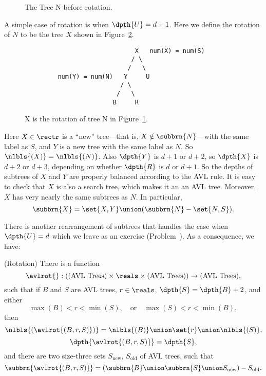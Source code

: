 \begin{definition}
\begin{figure}
\caption{The Tree N before rotation.}

\label{rotate1}

\end{figure}

A simple case of rotation is when $\dpth{U} = d+1$.  Here we define
the rotation of $N$ to be the tree $X$ shown in Figure~\ref{rotate2}.

\begin{figure}

\begin{verbatim}
                              X   num(X) = num(S)
                             / \
                            /   \
         num(Y) = num(N)   Y     U
                          / \  
                         /   \
                        B     R   
\end{verbatim}

\caption{X is the rotation of tree N in Figure~\ref{rotate1}.}

\label{rotate2}
                                                                   
\end{figure}                                                       

Here $X \in \rectr$ is a ``new'' tree---that is, $X \notin
\subbrn{N}$---with the same label as $S$, and $Y$ is a new tree with
the same label as $N$.  So $\nlbls{(X)} = \nlbls{(N)}$.  Also
$\dpth{Y}$ is $d+1$ or $d+2$, so $\dpth{X}$ is $d+2$ or $d+3$,
depending on whether $\dpth{R}$ is $d$ or $d+1$.  So the depths of
subtrees of $X$ and $Y$ are properly balanced according to the AVL
rule.  It is easy to check that $X$ is also a search tree, which makes
it an an AVL tree.  Moreover, $X$ has very nearly the same subtrees as
$N$.  In particular,
\[
\subbrn{X} = \set{X,Y} \union (\subbrn{N} - \set{N,S}).
\]

There is another rearrangement of subtrees that handles the case when
$\dpth{U} = d$ which we leave as an exercise
(Problem~).  As a consequence, we have:

\begin{lemma}(Rotation)\label{lem:rot}
There is a function
\[
\avlrot{}: (\text{(AVL Trees)} \times \reals\times \text{(AVL Trees)}) \to \text{(AVL Trees)},
\]
such that if $B$ and $S$ are AVL trees, $r \in \reals$, $\dpth{S}=\dpth{B}+2$, and either
\[
\max(B) < r < \min(S),\quad \text{or}\quad  \max(S) < r < \min(B),
\]
then
\[
    \nlbls{(\avlrot{(B,r,S)})} = \nlbls{(B)} \union \set{r} \union \nlbls{(S)},
\]
\[
\dpth{\avlrot{(B,r,S)}} = \dpth{S},
\]
and there are two size-three sets $S_{\text{new}}$, $S_{\text{old}}$
of AVL trees, such that
\[
\subbrn{\avlrot{(B,r,S)}} = (\subbrn{B} \union \subbrn{S} \union S_{\text{new}}) - S_{\text{old}}.
\]
\end{lemma}


\end{definition}
